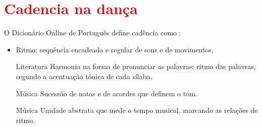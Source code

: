 \section{\textcolor{red}{Cadencia na dança }}

\begin{definition}[Cadência:] 
\label{def:cadencia}
O Dicionário Online de Português define cadência como \cite{diciocadencia}:
\begin{itemize}
\item Ritmo; sequência encadeada e regular de sons e de movimentos.
\item [Literatura] Harmonia na forma de pronunciar as palavras; ritmo das palavras, segundo a acentuação tônica de cada sílaba.
\item [Música] Sucessão de notas e de acordes que definem o tom.
\item [Música] Unidade abstrata que mede o tempo musical, marcando as relações de ritmo.
\end{itemize}
\end{definition}




